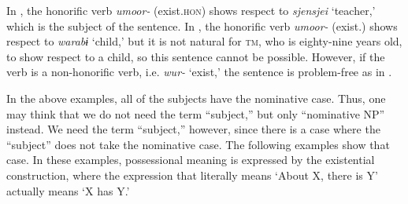 In , the honorific verb \textit{umoor-} (exist.\textsc{hon}) shows respect to \textit{sjensjei} ‘teacher,’ which is the subject of the sentence. In , the honorific verb \textit{umoor-} (exist.\HON) shows respect to \textit{warabɨ} ‘child,’ but it is not natural for \textsc{tm}, who is eighty-nine years old, to show respect to a child, so this sentence cannot be possible. However, if the verb is a non-honorific verb, i.e. \textit{wur-} ‘exist,’ the sentence is problem-free as in .

In the above examples, all of the subjects have the nominative case. Thus, one may think that we do not need the term “subject,” but only “nominative NP” instead. We need the term “subject,” however, since there is a case where the “subject” does not take the nominative case. The following examples show that case. In these examples, possessional meaning is expressed by the existential construction, where the expression that literally means ‘About X, there is Y’ actually means ‘X has Y.’

